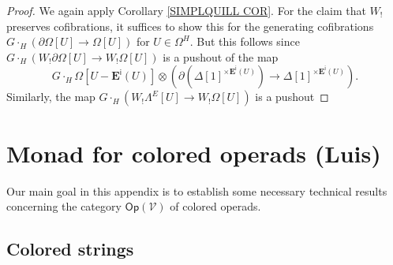 \documentclass[a4paper,10pt
,draft
]{article}%
\renewcommand{\1}{\eta}%
\begin{document}
\begin{proof}
	We again apply Corollary \ref{SIMPLQUILL COR}.
	For the claim that $W_!$ preserves cofibrations,
	it suffices to show this for the generating cofibrations
	$G\cdot_H \left( \partial \Omega[U] \to \Omega[U] \right)$ for $U \in \Omega^H$.
	But this follows since 
	$G \cdot_H \left(W_! \partial \Omega[U] \to W_! \Omega[U] \right)$
	is a pushout of the map
\[
	G \cdot_H \Omega[U - \boldsymbol{E}^{\mathsf{i}}(U)]
\otimes
	\left(
	\partial \left( \Delta[1]^{\times \boldsymbol{E}^{\mathsf{i}}(U) } \right) 
		\to
	\Delta[1]^{\times \boldsymbol{E}^{\mathsf{i}}(U) }
	\right).
\]
Similarly, the map
	$G \cdot_H \left(W_! \Lambda^E[U] \to W_! \Omega[U] \right)$
is a pushout 


	
\end{proof}

















\appendix


\section{Monad for colored operads (Luis)}


Our main goal in this appendix is to establish some necessary technical results concerning the category $\mathsf{Op}(\mathcal{V})$ of colored operads.



\subsection{Colored strings}
\end{document}
